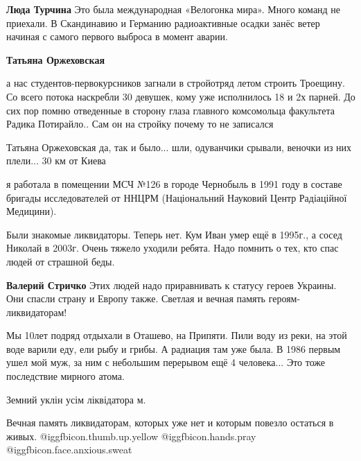 \begin{itemize}
\begin{itemize}
\begin{itemize}
\textbf{Люда Турчина} Это была международная «Велогонка мира». Много команд не приехали. В Скандинавию и Германию радиоактивные осадки занёс ветер начиная с самого первого выброса в момент аварии.
\end{itemize} %

\textbf{Татьяна Оржеховская} 

а нас студентов-первокурсников загнали в стройотряд летом строить Троещину. Со
всего потока наскребли 30 девушек, кому уже исполнилось 18 и 2х парней. До сих
пор помню отведенные в сторону глаза главного комсомольца факультета Радика
Потирайло.. Сам он на стройку почему то не записался


Татьяна Оржеховская да, так и было... шли, одуванчики срывали, веночки из них
плели... 30 км от Киева

\end{itemize} %


я работала в помещении МСЧ №126 в городе Чернобыль в 1991 году в составе
бригады исследователей от ННЦРМ (Національний Науковий Центр Радіаційної
Медицини).



Были знакомые ликвидаторы. Теперь нет. Кум Иван умер ещё в 1995г., а сосед Николай
в 2003г. Очень тяжело уходили ребята. Надо помнить о тех, кто спас людей от
страшной беды.

\begin{itemize} %
\textbf{Валерий Стричко} Этих людей надо приравнивать к статусу героев Украины.
Они спасли страну и Европу также.
Светлая и вечная память героям-ликвидаторам!
\end{itemize} %


Мы 10лет подряд отдыхали в Оташево, на Припяти. Пили воду из реки, на этой воде
варили еду, ели рыбу и грибы. А радиация там уже была. В 1986 первым ушел мой
муж, за ним с небольшим перерывом ещё 4 человека... Это тоже последствие мирного
атома.


Земний уклін усім ліквідатора м.


Вечная память ликвидаторам, которых уже нет и которым повезло остаться в живых.
@igg{fbicon.thumb.up.yellow}  @igg{fbicon.hands.pray}  @igg{fbicon.face.anxious.sweat} 

\end{itemize} %


